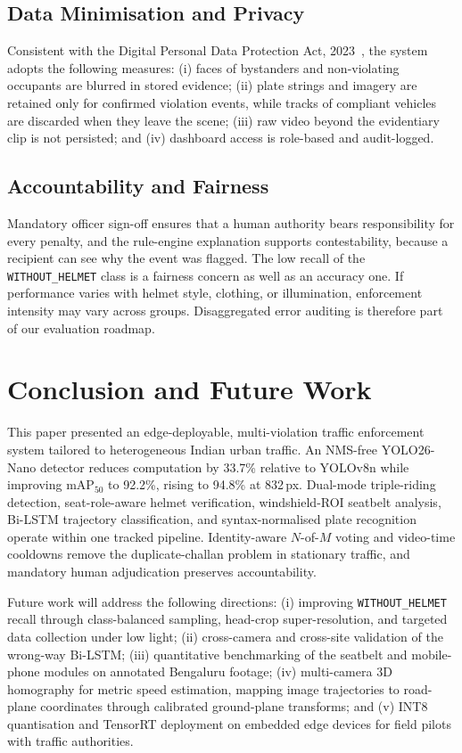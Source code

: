 \documentclass[conference]{IEEEtran}
\begin{document}
\subsection{Data Minimisation and Privacy}
Consistent with the Digital Personal Data Protection Act, 2023~\cite{dpdp2023}, the system adopts the following measures:
(i) faces of bystanders and non-violating occupants are blurred in stored evidence;
(ii) plate strings and imagery are retained only for confirmed violation events, while tracks of compliant vehicles are discarded when they leave the scene;
(iii) raw video beyond the evidentiary clip is not persisted; and
(iv) dashboard access is role-based and audit-logged.

\subsection{Accountability and Fairness}
Mandatory officer sign-off ensures that a human authority bears responsibility for every penalty, and the rule-engine explanation supports contestability, because a recipient can see why the event was flagged. The low recall of the \texttt{WITHOUT\_HELMET} class is a fairness concern as well as an accuracy one. If performance varies with helmet style, clothing, or illumination, enforcement intensity may vary across groups. Disaggregated error auditing is therefore part of our evaluation roadmap.

\section{Conclusion and Future Work}

This paper presented an edge-deployable, multi-violation traffic enforcement system tailored to heterogeneous Indian urban traffic. An NMS-free YOLO26-Nano detector reduces computation by 33.7\% relative to YOLOv8n while improving mAP$_{50}$ to 92.2\%, rising to 94.8\% at 832\,px. Dual-mode triple-riding detection, seat-role-aware helmet verification, windshield-ROI seatbelt analysis, Bi-LSTM trajectory classification, and syntax-normalised plate recognition operate within one tracked pipeline. Identity-aware $N$-of-$M$ voting and video-time cooldowns remove the duplicate-challan problem in stationary traffic, and mandatory human adjudication preserves accountability.

Future work will address the following directions:
(i) improving \texttt{WITHOUT\_HELMET} recall through class-balanced sampling, head-crop super-resolution, and targeted data collection under low light;
(ii) cross-camera and cross-site validation of the wrong-way Bi-LSTM;
(iii) quantitative benchmarking of the seatbelt and mobile-phone modules on annotated Bengaluru footage;
(iv) multi-camera 3D homography for metric speed estimation, mapping image trajectories to road-plane coordinates through calibrated ground-plane transforms; and
(v) INT8 quantisation and TensorRT deployment on embedded edge devices for field pilots with traffic authorities.
\end{document}
